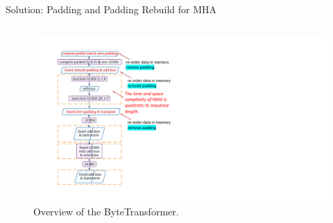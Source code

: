 \begin{frame}{Solution: Padding and Padding Rebuild for MHA}
\begin{columns}[c]
    \begin{column}{.5\textwidth}
    \begin{figure}
        \centering
        \includegraphics[width=1.\textwidth]{./images/byte-transformer-overview2.pdf}
        \caption{Overview of the ByteTransformer.}
    \end{figure}      
    \end{column}


\end{columns}
\end{frame}
